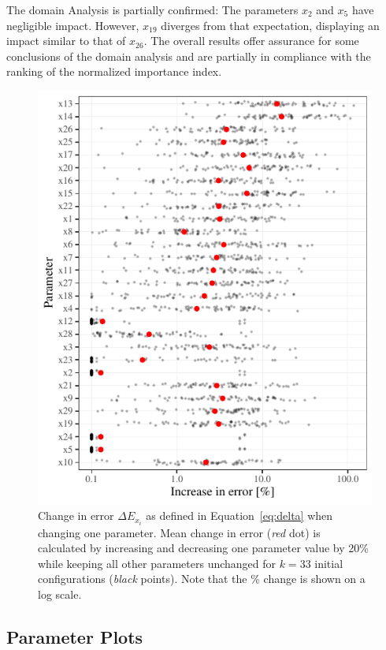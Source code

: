 \documentclass[conference]{IEEEtran}
\begin{document}
The domain Analysis is partially confirmed: The parameters \emph{$x_{2}$} and \emph{$x_{5}$} have negligible impact.
However, \emph{$x_{19}$} diverges from that expectation, displaying an impact similar to that of \emph{$x_{26}$}. 
The overall results offer assurance for some conclusions of the domain analysis and are partially in compliance with the ranking of the normalized importance index. 

\begin{figure}
    \centering
    \includegraphics{variable_error_change.pdf}
    \caption{%
    Change in error $\Delta E_{x_i}$ as defined in Equation~\ref{eq:delta} when changing one parameter. 
    Mean change in error (\emph{red}\/ dot) is calculated by increasing and decreasing one parameter value 
    by 20\% while keeping all other parameters unchanged for $k=33$ initial configurations (\emph{black}\/ points).
    Note that the \% change is shown on a log scale.}
\label{fig:errorChangebarplot}
\end{figure}

\subsection{Parameter Plots}
\end{document}
